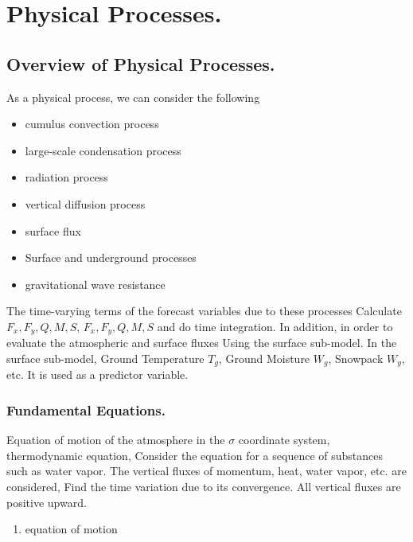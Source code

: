 \hypertarget{physical-processes.}{%
\section{Physical Processes.}\label{physical-processes.}}

\hypertarget{overview-of-physical-processes.}{%
\subsection{Overview of Physical
Processes.}\label{overview-of-physical-processes.}}

As a physical process, we can consider the following

\begin{itemize}
\item
  cumulus convection process
\item
  large-scale condensation process
\item
  radiation process
\item
  vertical diffusion process
\item
  surface flux
\item
  Surface and underground processes
\item
  gravitational wave resistance
\end{itemize}

The time-varying terms of the forecast variables due to these processes
Calculate \(F_x, F_y, Q, M, S\), \(F_x, F_y, Q, M, S\) and do time
integration. In addition, in order to evaluate the atmospheric and
surface fluxes Using the surface sub-model. In the surface sub-model,
Ground Temperature \(T_g\), Ground Moisture \(W_g\), Snowpack \(W_y\),
etc. It is used as a predictor variable.

\hypertarget{fundamental-equations.}{%
\subsubsection{Fundamental Equations.}\label{fundamental-equations.}}

Equation of motion of the atmosphere in the \(\sigma\) coordinate
system, thermodynamic equation, Consider the equation for a sequence of
substances such as water vapor. The vertical fluxes of momentum, heat,
water vapor, etc. are considered, Find the time variation due to its
convergence. All vertical fluxes are positive upward.

\begin{enumerate}
\def\labelenumi{\arabic{enumi}.}
\tightlist
\item
  equation of motion
\end{enumerate}

